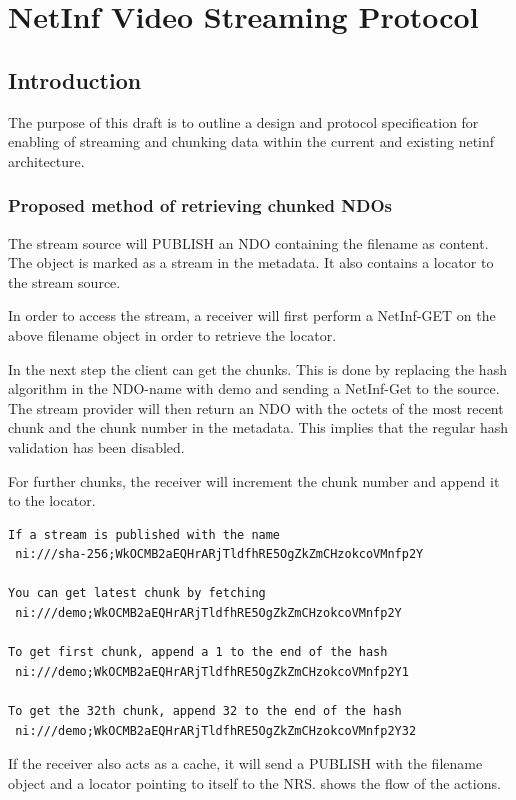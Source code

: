 \section {NetInf Video Streaming Protocol}\label{VideoDraft}

\subsection{Introduction}

The purpose of this draft is to outline a design and protocol specification for enabling of streaming and chunking data within the current and existing netinf architecture.

\subsubsection{Proposed method of retrieving chunked NDOs}

The stream source will PUBLISH an NDO containing the filename as content. The object is marked as a stream in the metadata. It also contains a locator to the stream source.

In order to access the stream, a receiver will first perform a NetInf-GET on the above filename object in order to retrieve the locator. 

In the next step the client can get the chunks. This is done by replacing the hash algorithm in the NDO-name with demo and sending a NetInf-Get to the source. The stream provider will then return an NDO with the octets of the most recent chunk and the chunk number in the metadata. This implies that the regular hash validation has been disabled.

For further chunks, the receiver will increment the chunk number and append it to the locator.
\begin{verbatim}
If a stream is published with the name
 ni:///sha-256;WkOCMB2aEQHrARjTldfhRE5OgZkZmCHzokcoVMnfp2Y

You can get latest chunk by fetching
 ni:///demo;WkOCMB2aEQHrARjTldfhRE5OgZkZmCHzokcoVMnfp2Y

To get first chunk, append a 1 to the end of the hash
 ni:///demo;WkOCMB2aEQHrARjTldfhRE5OgZkZmCHzokcoVMnfp2Y1

To get the 32th chunk, append 32 to the end of the hash
 ni:///demo;WkOCMB2aEQHrARjTldfhRE5OgZkZmCHzokcoVMnfp2Y32
\end{verbatim}
 
If the receiver also acts as a cache, it will send a PUBLISH with the filename object and a locator pointing to itself to the NRS.
 shows the flow of the actions. 
\\

